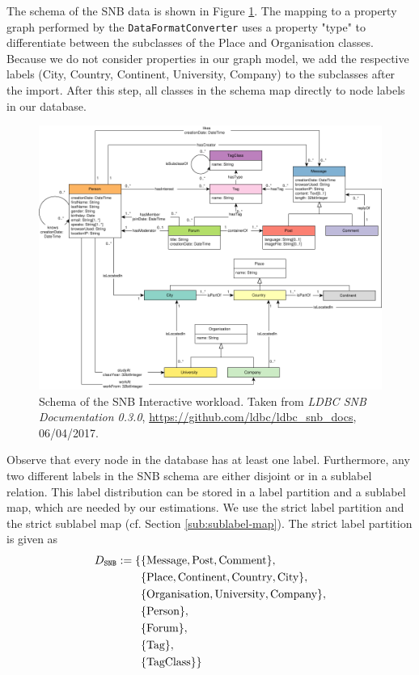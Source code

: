 The schema of the SNB data is shown in Figure \ref{fig:snb-schema}.
The mapping to a property graph performed by the \texttt{DataFormatConverter}
uses a property "type" to differentiate between the subclasses of the Place and
Organisation classes.
Because we do not consider properties in our graph model, we add the
respective labels (City, Country, Continent, University, Company) to the
subclasses after the import.
After this step, all classes in the schema map directly to node labels in
our database.

\begin{figure}
  \centering
  \includegraphics[width=\textwidth]{figures/snb_schema.pdf}
  \caption{Schema of the SNB Interactive workload. Taken from
  \textit{LDBC SNB Documentation 0.3.0},
  \url{https://github.com/ldbc/ldbc_snb_docs},
  06/04/2017.}
  \label{fig:snb-schema}
\end{figure}

Observe that every node in the database has at least one label.
Furthermore, any two different labels in the SNB schema are either disjoint or
in a sublabel relation.
This label distribution can be stored in a label partition and a sublabel
map, which are needed by our estimations.
We use the strict label partition and the strict sublabel map
(cf. Section \ref{sub:sublabel-map}).
The strict label partition is given as
\begin{align}
\begin{split}
  D_{\texttt{SNB}} := \{ &\{ \text{Message}, \text{Post}, \text{Comment} \}, \\
                    &\{ \text{Place}, \text{Continent}, \text{Country},
                        \text{City} \}, \\
                    &\{ \text{Organisation}, \text{University},
                        \text{Company} \}, \\
                    &\{ \text{Person} \}, \\
                    &\{ \text{Forum} \}, \\
                    &\{ \text{Tag} \}, \\
                    &\{ \text{TagClass} \} \}
\end{split}
\end{align}

